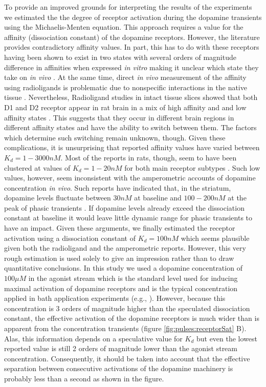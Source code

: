   To provide an improved grounds for interpreting the results of the experiments we estimated the the degree of receptor activation during the dopamine transients using the Michaelis-Menten equation. This approach requires a value for the affinity (dissociation constant) of the dopamine receptors. However, the literature provides contradictory affinity values. In part, this has to do with these receptors having been shown to exist in two states with several orders of magnitude difference in affinities when expressed \textit{in vitro} making it unclear which state they take on \textit{in vivo} \cite{seeman1994dopamine,richfield1989anatomical}. At the same time, direct \textit{in vivo} measurement of the affinity using radioligands is problematic due to nonspecific interactions in the native tissue \cite{seeman1980brain}. Nevertheless, Radioligand studies in intact tissue slices showed that both D1 and D2 receptor appear in rat brain in a mix of high affinity and and low affinity states \cite{richfield1989anatomical}. This suggests that they occur in different brain regions in different affinity states and have the ability to switch between them. The factors which determine such switching remain unknown, though. Given these complications, it is unsurprising that reported affinity values have varied between \(K_{d}=1-3000 nM\). Most of the reports in rats, though, seem to have been clustered at values of \(K_{d}=1-20 nM\) for both main receptor subtypes \cite{seeman1980brain}. Such low values, however, seem inconsistent with the amperometric accounts of dopamine concentration \textit{in vivo}. Such reports have indicated that, in the striatum, dopamine levels fluctuate between \(30nM\) at baseline and \(100-200nM\) at the peak of phasic transients \cite{venton2003real,brown2011primary,phillips2003subsecond}. If dopamine levels already exceed the dissociation constant at baseline it would leave little dynamic range for phasic transients to have an impact. Given these arguments, we finally estimated the receptor activation using a dissociation constant of \(K_{d}=100 nM\) which seems plausible given both the radioligand and the amperometric reports. However, this very rough estimation is used solely to give an impression rather than to draw quantitative conclusions. In this study we used a dopamine concentration of \(100 \mu M\) in the agonist stream which is the standard level used for inducing maximal activation of dopamine receptors \cite{seeman1980brain} and is the typical concentration applied in bath application experiments (e.g., \cite{eytan2004dopamine,yagishita2014critical}). However, because this concentration is 3 orders of magnitude higher than the speculated dissociation constant, the effective activation of the dopamine receptors is much wider than is apparent from the concentration transients (figure \ref{fig:pulses:receptorSat} B). Alas, this information depends on a speculative value for \(K_{d}\) but even the lowest reported value is still 2 orders of magnitude lower than the agonist stream concentration. Consequently, it should be taken into account that the effective separation between consecutive activations of the dopamine machinery is probably less than a second as shown in the figure.

